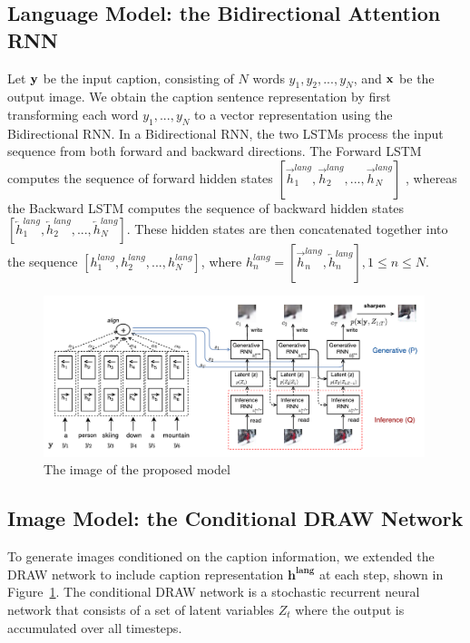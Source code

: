 \documentclass{article} %
\newcommand{\hlang}{h^{lang}}
\newcommand{\hlangall}{\boldsymbol{h^{lang}}}
\newcommand{\Lat}{Z}
\newcommand{\icaption}{{\bf{y}}}
\newcommand{\oimage}{{\bf{x}}}
\begin{document}
\subsection{Language Model: the Bidirectional Attention RNN}
\label{sec:lang}
Let $\icaption$ be the input caption, consisting of $N$ words $y_{1}, y_{2}, ..., y_{N}$, and $\oimage$ be the output image. We obtain the caption sentence representation by first transforming each word $y_{1},...,y_{N}$ to a vector representation using the Bidirectional RNN. In a Bidirectional RNN, the two LSTMs process the input sequence from both forward and backward directions. The Forward LSTM computes the sequence of forward hidden states $[\overrightarrow{h}^{lang}_{1}, \overrightarrow{h}^{lang}_{2}, ..., \overrightarrow{h}^{lang}_{N}]$ , whereas the Backward LSTM computes the sequence of backward hidden states $[\overleftarrow{h}^{lang}_{1}, \overleftarrow{h}^{lang}_{2}, ..., \overleftarrow{h}^{lang}_{N}]$. These hidden states are then concatenated together into the sequence $[\hlang_{1}, \hlang_{2}, ..., \hlang_{N}]$, where $\hlang_{n} = [\overrightarrow{h}^{lang}_{n}, \overleftarrow{h}^{lang}_{n}], 1\leq n\leq N$.

\begin{figure}[!t]
\captionsetup[subfigure]{labelformat=empty}
\begin{center}
\includegraphics[width=0.99\textwidth]{figures/alignDrawAnnotated.pdf}\quad
%
\end{center}
\caption{The image of the proposed model}
\label{fig:figmodel}
\vspace{-0.3cm}
\end{figure}



\subsection{Image Model: the Conditional DRAW Network}

To generate images conditioned on the caption information, we extended the DRAW network \citep{gregor_draw} to include caption representation $\hlangall$ at each step, shown in Figure~\ref{fig:figmodel}. The conditional DRAW network is a stochastic recurrent neural network that consists of a set of latent variables $\Lat_t$ where the output is accumulated over all timesteps.
\end{document}
